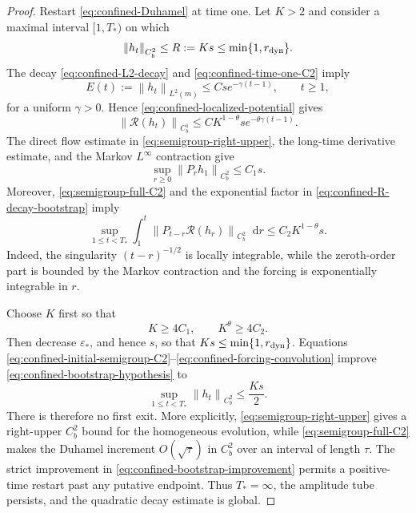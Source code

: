 \documentclass[11pt,reqno]{amsart}
\numberwithin{equation}{section}
\theoremstyle{definition}
\theoremstyle{remark}
\newcommand{\dd}{\mathop{}\!\mathrm d}
\newcommand{\norm}[1]{\left\lVert#1\right\rVert}
\begin{document}
\begin{proof}
Restart \eqref{eq:confined-Duhamel} at time one. Let $K>2$ and consider a maximal interval $[1,T_*)$ on which
\begin{equation}\label{eq:confined-bootstrap-hypothesis}
 \norm{h_t}_{C_b^2}\leq R:=Ks\leq\min\{1,r_{\rm dyn}\}.
\end{equation}
The decay \eqref{eq:confined-L2-decay} and \eqref{eq:confined-time-one-C2} imply
\begin{equation}\label{eq:confined-E-decay-from-one}
 E(t):=\norm{h_t}_{L^2(m)}\leq Cs e^{-\gamma(t-1)},
 \qquad t\geq1,
\end{equation}
for a uniform $\gamma>0$. Hence \eqref{eq:confined-localized-potential} gives
\begin{equation}\label{eq:confined-R-decay-bootstrap}
 \norm{\mathcal R(h_t)}_{C_b^1}
 \leq C K^{1-\theta}s e^{-\theta\gamma(t-1)}.
\end{equation}
The direct flow estimate in \eqref{eq:semigroup-right-upper}, the long-time derivative estimate, and the Markov $L^\infty$ contraction give
\begin{equation}\label{eq:confined-initial-semigroup-C2}
 \sup_{r\geq0}\norm{P_rh_1}_{C_b^2}\leq C_1s.
\end{equation}
Moreover, \eqref{eq:semigroup-full-C2} and the exponential factor in \eqref{eq:confined-R-decay-bootstrap} imply
\begin{equation}\label{eq:confined-forcing-convolution}
 \sup_{1\leq t<T_*}
 \int_1^t\norm{P_{t-r}\mathcal R(h_r)}_{C_b^2}\dd r
 \leq C_2K^{1-\theta}s.
\end{equation}
Indeed, the singularity $(t-r)^{-1/2}$ is locally integrable, while the zeroth-order part is bounded by the Markov contraction and the forcing is exponentially integrable in $r$.

Choose $K$ first so that
\begin{equation}\label{eq:confined-K-choice}
 K\geq4C_1,\qquad K^\theta\geq4C_2.
\end{equation}
Then decrease $\varepsilon_*$, and hence $s$, so that $Ks\leq\min\{1,r_{\rm dyn}\}$. Equations \eqref{eq:confined-initial-semigroup-C2}--\eqref{eq:confined-forcing-convolution} improve \eqref{eq:confined-bootstrap-hypothesis} to
\begin{equation}\label{eq:confined-bootstrap-improvement}
 \sup_{1\leq t<T_*}\norm{h_t}_{C_b^2}\leq\frac{Ks}{2}.
\end{equation}
There is therefore no first exit. More explicitly, \eqref{eq:semigroup-right-upper} gives a right-upper $C_b^2$ bound for the homogeneous evolution, while \eqref{eq:semigroup-full-C2} makes the Duhamel increment $O(\sqrt\tau)$ in $C_b^2$ over an interval of length $\tau$. The strict improvement in \eqref{eq:confined-bootstrap-improvement} permits a positive-time restart past any putative endpoint. Thus $T_*=\infty$, the amplitude tube persists, and the quadratic decay estimate is global.


\end{proof}
\end{document}
